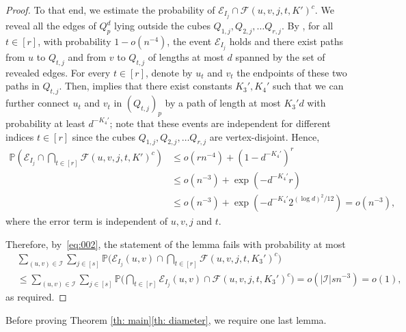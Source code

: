 \documentclass[reqno,final,a4paper]{amsart}
\theoremstyle{definition}
\newcommand{\cE}{\mathcal{E}}
\newcommand{\cF}{\mathcal{F}}
\newcommand{\cI}{\mathcal{I}}
\newcommand{\1}{\mathbbm{1}}
\begin{document}
\begin{proof}
To that end, we estimate the probability of $\cE_{I_j}\cap \cF(u,v,j,t,K')^c$. 
We reveal all the edges of $Q_p^d$ lying outside the cubes $Q_{1,j},Q_{2,j},\ldots Q_{r,j}$. 
By , for all $t\in [r]$,
with probability $1-o(n^{-4})$, the event $\cE_{I_j}$ holds and there exist paths from $u$ to $Q_{t,j}$ and from $v$ to $Q_{t,j}$ of lengths at most $d$ spanned by the set of revealed edges.
For every $t\in [r]$, denote by $u_t$ and $v_t$ the endpoints of these two paths in $Q_{t,j}$.
Then,  implies that there exist constants $K_3',K_4'$ such that we can further connect $u_t$ and $v_t$ in $(Q_{t,j})_p$ by a path of length at most $K_3'd$ with probability at least $d^{-K_4'}$; 
note that these events are independent for different indices $t\in [r]$ since the cubes $Q_{1,j},Q_{2,j},\ldots Q_{r,j}$ are vertex-disjoint. 
Hence,  
\begin{align*}
\mathbb{P}\left(\cE_{I_j}\cap \bigcap_{t\in[r]}\cF(u,v,j,t,K')^c\right)&\le o(rn^{-4})+\left(1-d^{-K_4'}\right)^{r}\\
&\leq  o(n^{-3})+\exp(-d^{-K_4'}r)\\&\le o(n^{-3})+\exp\left(-d^{-K_4'}2^{(\log d)^2/12}\right)=o(n^{-3}),
\end{align*}
where the error term is independent of $u,v,j$ and $t$.

Therefore, by~\eqref{eq:002}, the statement of the lemma fails with probability at most
\[\begin{split}
&\sum_{(u,v)\in \cI} \sum_{j\in [s]} \mathbb P\bigg(\cE_{I_j}(u,v)\cap \bigcap_{t\in [r]} \cF(u,v,j,t,K_3')^c\bigg)\\
&\le \sum_{(u,v)\in \cI} \sum_{j\in [s]} \mathbb P\bigg( \bigcap_{t\in [r]}\cE_{I_j}(u,v)\cap \cF(u,v,j,t,K_3')^c\bigg)=o(|\cI|sn^{-3})=o(1),
\end{split}\]
as required.
\end{proof}

Before proving Theorem \ref{th: main}\ref{th: diameter}, we require one last lemma.
\end{document}
